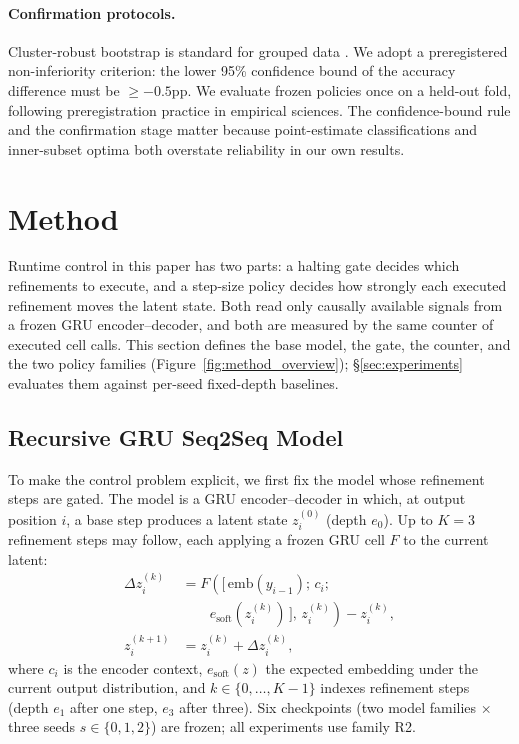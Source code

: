 ﻿\documentclass[11pt]{article}
\begin{document}
\paragraph{Confirmation protocols.}
Cluster-robust bootstrap is standard for grouped data \citep{cameron2015practitioner}. We adopt a preregistered non-inferiority criterion: the lower 95\% confidence bound of the accuracy difference must be $\geq -0.5$pp. We evaluate frozen policies once on a held-out fold, following preregistration practice in empirical sciences. The confidence-bound rule and the confirmation stage matter because point-estimate classifications and inner-subset optima both overstate reliability in our own results.

\section{Method}
\label{sec:method}

Runtime control in this paper has two parts: a halting gate decides which refinements to execute, and a step-size policy decides how strongly each executed refinement moves the latent state. Both read only causally available signals from a frozen GRU encoder--decoder, and both are measured by the same counter of executed cell calls. This section defines the base model, the gate, the counter, and the two policy families (Figure~\ref{fig:method_overview}); \S\ref{sec:experiments} evaluates them against per-seed fixed-depth baselines.

\subsection{Recursive GRU Seq2Seq Model}
\label{sec:model}
To make the control problem explicit, we first fix the model whose refinement steps are gated. The model is a GRU encoder--decoder \citep{cho2014gru,sutskever2014seq2seq} in which, at output position $i$, a base step produces a latent state $z_i^{(0)}$ (depth $e_0$). Up to $K{=}3$ refinement steps may follow, each applying a frozen GRU cell $F$ to the current latent:
\begin{equation}
\begin{aligned}
\Delta z_i^{(k)} &= F\!\left(\big[\,\mathrm{emb}(y_{i-1});\,c_i;\right.\\
 &\qquad\left. e_{\mathrm{soft}}(z_i^{(k)})\,\big],\, z_i^{(k)}\right)-z_i^{(k)},\\
z_i^{(k+1)} &= z_i^{(k)} + \Delta z_i^{(k)},
\end{aligned}
\label{eq:refine}
\end{equation}
where $c_i$ is the encoder context, $e_{\mathrm{soft}}(z)$ the expected embedding under the current output distribution, and $k \in \{0,\dots,K{-}1\}$ indexes refinement steps (depth $e_1$ after one step, $e_3$ after three). Six checkpoints (two model families $\times$ three seeds $s \in \{0,1,2\}$) are frozen; all experiments use family R2.
\end{document}
